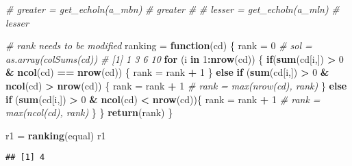 \documentclass[]{article}
\newenvironment{Shaded}{\begin{snugshade}}{\end{snugshade}}
\newcommand{\CommentTok}[1]{\textcolor[rgb]{0.56,0.35,0.01}{\textit{#1}}}
\newcommand{\ControlFlowTok}[1]{\textcolor[rgb]{0.13,0.29,0.53}{\textbf{#1}}}
\newcommand{\DecValTok}[1]{\textcolor[rgb]{0.00,0.00,0.81}{#1}}
\newcommand{\KeywordTok}[1]{\textcolor[rgb]{0.13,0.29,0.53}{\textbf{#1}}}
\newcommand{\NormalTok}[1]{#1}
\newcommand{\OperatorTok}[1]{\textcolor[rgb]{0.81,0.36,0.00}{\textbf{#1}}}
\newcommand{\StringTok}[1]{\textcolor[rgb]{0.31,0.60,0.02}{#1}}
\begin{document}
\begin{Shaded}
\begin{Highlighting}[]
\CommentTok{# greater = get_echoln(a_mbn)}
\CommentTok{# greater}
\CommentTok{# }
\CommentTok{# lesser = get_echoln(a_mln)}
\CommentTok{# lesser}
\end{Highlighting}
\end{Shaded}

\begin{Shaded}
\begin{Highlighting}[]
\CommentTok{# rank needs to be modified}
\NormalTok{ranking =}\StringTok{ }\ControlFlowTok{function}\NormalTok{(cd) \{}
\NormalTok{  rank =}\StringTok{ }\DecValTok{0}
  \CommentTok{# sol = as.array(colSums(cd))}
  \CommentTok{# [1]  1  3  6 10}
  \ControlFlowTok{for}\NormalTok{ (i }\ControlFlowTok{in} \DecValTok{1}\OperatorTok{:}\KeywordTok{nrow}\NormalTok{(cd)) \{}
    \ControlFlowTok{if}\NormalTok{(}\KeywordTok{sum}\NormalTok{(cd[i,]) }\OperatorTok{>}\StringTok{ }\DecValTok{0} \OperatorTok{&}\StringTok{ }\KeywordTok{ncol}\NormalTok{(cd) }\OperatorTok{==}\StringTok{ }\KeywordTok{nrow}\NormalTok{(cd)) \{}
\NormalTok{      rank =}\StringTok{ }\NormalTok{rank }\OperatorTok{+}\StringTok{ }\DecValTok{1}
\NormalTok{    \} }\ControlFlowTok{else} \ControlFlowTok{if}\NormalTok{ (}\KeywordTok{sum}\NormalTok{(cd[i,]) }\OperatorTok{>}\StringTok{ }\DecValTok{0} \OperatorTok{&}\StringTok{ }\KeywordTok{ncol}\NormalTok{(cd) }\OperatorTok{>}\StringTok{ }\KeywordTok{nrow}\NormalTok{(cd)) \{}
\NormalTok{      rank =}\StringTok{ }\NormalTok{rank }\OperatorTok{+}\StringTok{ }\DecValTok{1}
      \CommentTok{# rank = max(nrow(cd), rank)}
\NormalTok{    \} }\ControlFlowTok{else} \ControlFlowTok{if}\NormalTok{ (}\KeywordTok{sum}\NormalTok{(cd[i,]) }\OperatorTok{>}\StringTok{ }\DecValTok{0} \OperatorTok{&}\StringTok{ }\KeywordTok{ncol}\NormalTok{(cd) }\OperatorTok{<}\StringTok{ }\KeywordTok{nrow}\NormalTok{(cd))\{}
\NormalTok{      rank =}\StringTok{ }\NormalTok{rank }\OperatorTok{+}\StringTok{ }\DecValTok{1}
      \CommentTok{# rank = max(ncol(cd), rank)    }
\NormalTok{    \}}
\NormalTok{  \}}
  \KeywordTok{return}\NormalTok{(rank)}
\NormalTok{\}}

\NormalTok{r1 =}\StringTok{ }\KeywordTok{ranking}\NormalTok{(equal)}
\NormalTok{r1}
\end{Highlighting}
\end{Shaded}

\begin{verbatim}
## [1] 4
\end{verbatim}
\end{document}
